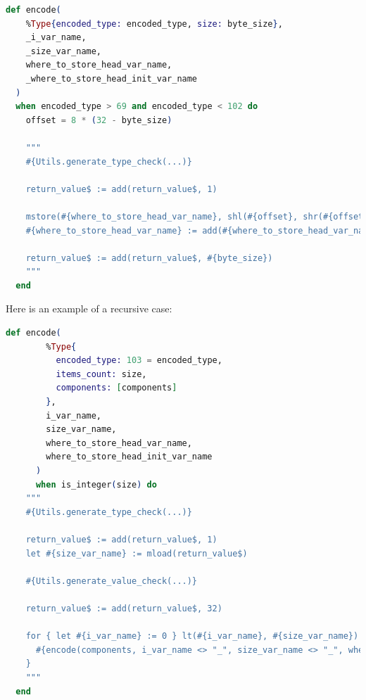 \begin{lstlisting}[language=elixir, caption={Encode base case}, label={lst:encode_base_case}]
  def encode(
    %Type{encoded_type: encoded_type, size: byte_size},
    _i_var_name,
    _size_var_name,
    where_to_store_head_var_name,
    _where_to_store_head_init_var_name
  )
  when encoded_type > 69 and encoded_type < 102 do
    offset = 8 * (32 - byte_size)

    """
    #{Utils.generate_type_check(...)}

    return_value$ := add(return_value$, 1)

    mstore(#{where_to_store_head_var_name}, shl(#{offset}, shr(#{offset}, mload(return_value$))))
    #{where_to_store_head_var_name} := add(#{where_to_store_head_var_name}, 32)

    return_value$ := add(return_value$, #{byte_size})
    """
  end
\end{lstlisting}

Here is an example of a recursive case:

\begin{lstlisting}[language=elixir, caption={Encode recursive case}, label={lst:encode_recursive_case}]
  def encode(
        %Type{
          encoded_type: 103 = encoded_type,
          items_count: size,
          components: [components]
        },
        i_var_name,
        size_var_name,
        where_to_store_head_var_name,
        where_to_store_head_init_var_name
      )
      when is_integer(size) do
    """
    #{Utils.generate_type_check(...)}

    return_value$ := add(return_value$, 1)
    let #{size_var_name} := mload(return_value$)

    #{Utils.generate_value_check(...)}

    return_value$ := add(return_value$, 32)

    for { let #{i_var_name} := 0 } lt(#{i_var_name}, #{size_var_name}) { #{i_var_name} := add(#{i_var_name}, 1) } {
      #{encode(components, i_var_name <> "_", size_var_name <> "_", where_to_store_head_var_name, where_to_store_head_init_var_name)}
    }
    """
  end
\end{lstlisting}
    